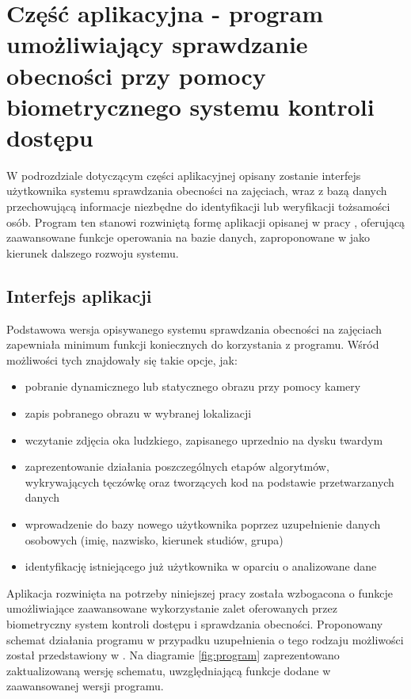 \section{Część aplikacyjna - program umożliwiający sprawdzanie obecności przy pomocy biometrycznego systemu kontroli dostępu}
\label{sec:systemKontroli}

W podrozdziale dotyczącym części aplikacyjnej opisany zostanie interfejs użytkownika systemu sprawdzania obecności na zajęciach, wraz z bazą danych przechowującą informacje niezbędne do identyfikacji lub weryfikacji tożsamości osób. Program ten stanowi rozwiniętą formę aplikacji opisanej w pracy \cite{Gl11}, oferującą zaawansowane funkcje operowania na bazie danych, zaproponowane w \cite{Gl11} jako kierunek dalszego rozwoju systemu.

\subsection{Interfejs aplikacji}
\label{subsec:aplikacja}

Podstawowa wersja opisywanego systemu sprawdzania obecności na zajęciach zapewniała minimum funkcji koniecznych do korzystania z programu. Wśród możliwości tych znajdowały się takie opcje, jak:
\begin{itemize}

\item pobranie dynamicznego lub statycznego obrazu przy pomocy kamery
\item zapis pobranego obrazu w wybranej lokalizacji
\item wczytanie zdjęcia oka ludzkiego, zapisanego uprzednio na dysku twardym
\item zaprezentowanie działania poszczególnych etapów algorytmów, wykrywających tęczówkę oraz tworzących kod na podstawie przetwarzanych danych
\item wprowadzenie do bazy nowego użytkownika poprzez uzupełnienie danych osobowych (imię, nazwisko, kierunek studiów, grupa)
\item identyfikację istniejącego już użytkownika w oparciu o analizowane dane

\end{itemize}
Aplikacja rozwinięta na potrzeby niniejszej pracy została wzbogacona o funkcje umożliwiające zaawansowane wykorzystanie zalet oferowanych przez biometryczny system kontroli dostępu i sprawdzania obecności. Proponowany schemat działania programu w przypadku uzupełnienia o tego rodzaju możliwości został przedstawiony w \cite{Gl11}. Na diagramie \ref{fig:program} zaprezentowano zaktualizowaną wersję schematu, uwzględniającą funkcje dodane w zaawansowanej wersji programu.

